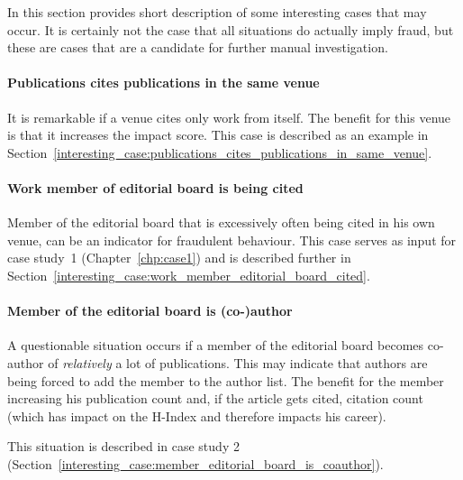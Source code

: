 \documentclass{ou-report}
\newcommand{\outline}[1]{{\color{blue} #1}}
\begin{document}
In this section provides short description of some interesting cases that may 
occur.
It is certainly not the case that all situations do actually imply fraud, but 
these are cases that are a candidate for further manual investigation.

\paragraph{Publications cites publications in the same venue} It is remarkable
if a venue cites only work from itself. The benefit for this venue is that it
increases the impact score. This case is described as an example in 
Section~\ref{interesting_case:publications_cites_publications_in_same_venue}.
\paragraph{Work member of editorial board is being cited} Member of the
editorial board that is excessively often being cited in his own venue, can be
an indicator for fraudulent behaviour. This case serves as input for case 
study~1 (Chapter~\ref{chp:case1}) and is described further in 
Section~\ref{interesting_case:work_member_editorial_board_cited}.
\paragraph{Member of the editorial board is (co-)author} 
A questionable situation occurs if a member of the editorial board becomes co-
author of \textit{relatively} a lot of publications. This may indicate that 
authors are being forced to add the member to the author list. The benefit for
the member increasing his publication count and, if the article gets cited, 
citation count (which has impact on the H-Index and therefore impacts his 
career).

This situation is described in case study 2
(Section~\ref{interesting_case:member_editorial_board_is_coauthor}).

\end{document}
